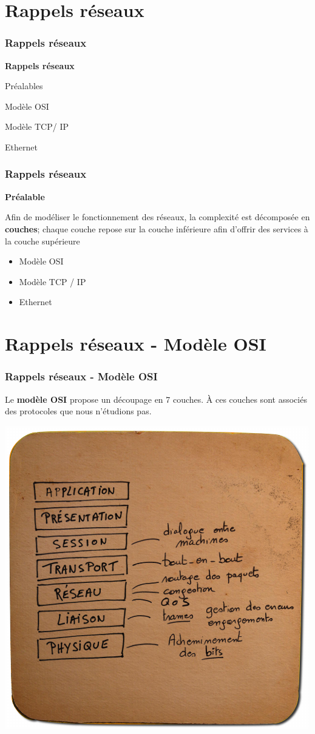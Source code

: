 \section{Rappels réseaux}

\begin{frame}[fragile]
  \frametitle{Rappels réseaux}
\begin{center}
	\Huge{\bf\color{blue}Rappels réseaux}
\end{center}
\begin{flushright}
  \item Préalables
  \item Modèle OSI
  \item Modèle TCP/ IP
  \item Ethernet
\end{flushright}
\end{frame}

\begin{frame}[fragile]
  \frametitle{Rappels réseaux}
{\bf\Large Préalable}

Afin de modéliser le fonctionnement des réseaux, la complexité est décomposée en
\textbf{couches}; chaque couche repose sur la couche inférieure afin d'offrir
des services à la couche supérieure
\begin{itemize}
	\item Modèle OSI
	\item Modèle TCP / IP
	\item Ethernet
\end{itemize}
\end{frame}


\section{Rappels réseaux - Modèle OSI}

\begin{frame}[fragile]
  \frametitle{Rappels réseaux - Modèle OSI}
Le \textbf{modèle OSI} propose un découpage en 7 couches. 
À ces couches sont associés des protocoles que nous n'étudions pas.

\begin{center}
	\includegraphics[width=.55\linewidth]{img/sousbock-modele-osi.png}
\end{center}
\end{frame}

